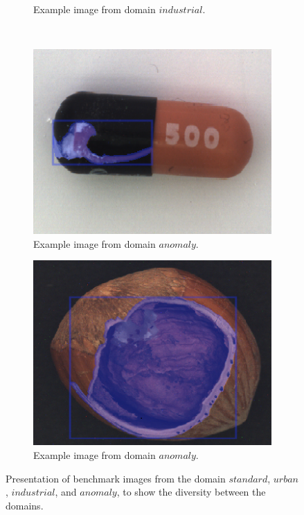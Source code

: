 \begin{figure}
\begin{subfigure}[t]{0.45\textwidth}
		\caption{
			Example image from domain $ industrial $.
		} \label{fig:ch4:sec4:domain_standard}
	\end{subfigure}	
	\\
	\begin{subfigure}[t]{0.45\textwidth}
		\centering
		\includegraphics[width=\textwidth]{figures/chap44_anomaly1.png}
		\caption{
			Example image from domain $ anomaly $.
		} \label{fig:ch4:sec4:domain_anomaly1}
	\end{subfigure}
	\hfill
	\begin{subfigure}[t]{0.45\textwidth}
		\centering
		\includegraphics[width=\textwidth]{figures/chap44_anomaly2.png}
		\caption{
			Example image from domain $ anomaly $.
		} \label{fig:ch4:sec4:domain_anomaly2}
	\end{subfigure}	
	\caption[Illustration of benchmark images]{
		Presentation of benchmark images from the domain $ standard $, $ urban $, $ industrial $, and $ anomaly $, to show the diversity between the domains.
	} \label{fig:ch4:sec4:image_domains}
\end{figure}

